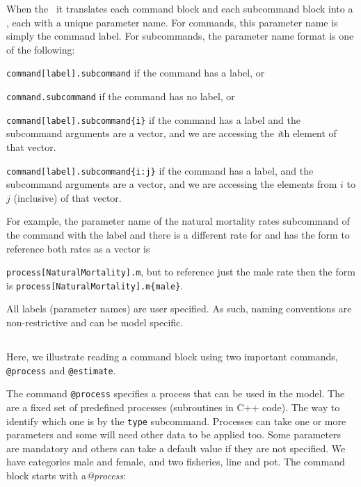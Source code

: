 When \CNAME\processes the \config~it translates each command block and each subcommand block into a \CNAME\object, each with a unique parameter name. For commands, this parameter name is simply the command label. For subcommands, the parameter name format is one of the following:

\begin{description}
\item \texttt{command[label].subcommand} if the command has a label, or
\item \texttt{command.subcommand} if the command has no label, or
\item \texttt{command[label].subcommand\{i\}} if the command has a label and the subcommand arguments are a vector, and we are accessing the  \emph{i}th element of that vector.
\item \texttt{command[label].subcommand\{i:j\}} if the command has a label, and the subcommand arguments are a vector, and we are accessing the elements from $i$ to $j$ (inclusive) of that vector.
\end{description}

For example, the parameter name of the natural mortality rates subcommand  of the command  with the label  and there is a different rate for  and  has the form to reference both rates as a vector  is

\texttt{process[NaturalMortality].m}, but to reference just the male rate then the form is
\texttt{process[NaturalMortality].m\{male\}}.

All labels (parameter names) are user specified. As such, naming conventions are non-restrictive and can be model specific.


\subsection{\label{sec:Readingcommandblock}}

Here, we illustrate reading a command block using two important commands, \texttt{@process} and \texttt{@estimate}.

The command \texttt{@process} specifies a process that can be used in the model. The are a fixed set of predefined processes (subroutines in C++ code). The way to identify which one is by the \texttt{type} subcommand. Processes can take one or more parameters and some will need other data to be applied too. Some parameters are mandatory and others can take a default value if they are not specified.
We have categories male and female, and two fisheries, line and pot. The command block starts with a\textit{@process}:

